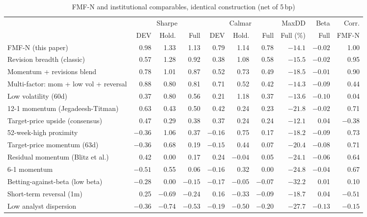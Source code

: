 \begin{table}[t]
\centering\footnotesize
\caption{FMF-N and institutional comparables, identical construction (net of 5\,bp)}\label{tab:league}
\begin{adjustbox}{max width=\textwidth}\begin{tabular}{lrrrrrrrrr}
\toprule
 & \multicolumn{3}{c}{Sharpe} & \multicolumn{3}{c}{Calmar} & MaxDD & Beta & Corr.\\
\cmidrule(lr){2-4}\cmidrule(lr){5-7}
 & DEV & Hold. & Full & DEV & Hold. & Full & Full (\%) & Full & FMF-N\\
\midrule
FMF-N (this paper) & 0.98 & 1.33 & 1.13 & 0.79 & 1.14 & 0.78 & $-14.1$ & $-0.02$ & 1.00\\
Revision breadth (classic) & 0.57 & 1.28 & 0.92 & 0.38 & 1.08 & 0.58 & $-15.5$ & $-0.02$ & 0.95\\
Momentum + revisions blend & 0.78 & 1.01 & 0.87 & 0.52 & 0.73 & 0.49 & $-18.5$ & $-0.01$ & 0.90\\
Multi-factor: mom + low vol + reversal & 0.88 & 0.80 & 0.81 & 0.71 & 0.52 & 0.42 & $-14.3$ & $-0.09$ & 0.44\\
Low volatility (60d) & 0.37 & 0.80 & 0.56 & 0.21 & 1.18 & 0.37 & $-13.6$ & $-0.10$ & 0.04\\
12-1 momentum (Jegadeesh-Titman) & 0.63 & 0.43 & 0.50 & 0.42 & 0.24 & 0.23 & $-21.8$ & $-0.02$ & 0.71\\
Target-price upside (consensus) & 0.47 & 0.29 & 0.38 & 0.37 & 0.24 & 0.24 & $-12.1$ & 0.04 & $-0.38$\\
52-week-high proximity & $-0.36$ & 1.06 & 0.37 & $-0.16$ & 0.75 & 0.17 & $-18.2$ & $-0.09$ & 0.73\\
Target-price momentum (63d) & $-0.36$ & 0.68 & 0.19 & $-0.15$ & 0.44 & 0.07 & $-20.4$ & $-0.08$ & 0.71\\
Residual momentum (Blitz et al.) & 0.42 & 0.00 & 0.17 & 0.24 & $-0.04$ & 0.05 & $-24.1$ & $-0.06$ & 0.64\\
6-1 momentum & $-0.51$ & 0.55 & 0.06 & $-0.16$ & 0.32 & 0.00 & $-24.8$ & $-0.04$ & 0.67\\
Betting-against-beta (low beta) & $-0.28$ & 0.00 & $-0.15$ & $-0.17$ & $-0.05$ & $-0.07$ & $-32.2$ & 0.01 & 0.10\\
Short-term reversal (1m) & 0.25 & $-0.69$ & $-0.24$ & 0.16 & $-0.33$ & $-0.09$ & $-18.7$ & 0.04 & $-0.51$\\
Low analyst dispersion & $-0.36$ & $-0.74$ & $-0.53$ & $-0.19$ & $-0.50$ & $-0.20$ & $-27.7$ & $-0.13$ & $-0.15$\\

\end{tabular}
\end{adjustbox}
\end{table}
